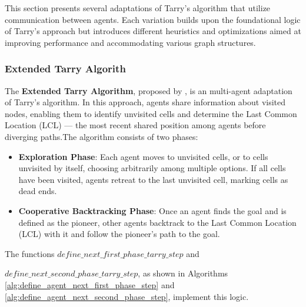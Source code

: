 This section presents several adaptations of Tarry's algorithm that utilize communication between agents. Each variation builds upon the foundational logic of Tarry's approach but introduces different heuristics and optimizations aimed at improving performance and accommodating various graph structures.

\subsubsection{Extended Tarry Algorith}
\label{section_method_extended_tarry}

The \textbf{Extended Tarry Algorithm}, proposed by , is an multi-agent adaptation of Tarry's algorithm. In this approach, agents share information about visited nodes, enabling them to identify unvisited cells and determine the Last Common Location (LCL) — the most recent shared position among agents before diverging paths.The algorithm consists of two phases:

\begin{itemize}
    \item \textbf{Exploration Phase}: Each agent moves to unvisited cells, or to cells unvisited by itself, choosing arbitrarily among multiple options. If all cells have been visited, agents retreat to the last unvisited cell, marking cells as dead ends.
    \item \textbf{Cooperative Backtracking Phase}: Once an agent finds the goal and is defined as the pioneer, other agents backtrack to the Last Common Location (LCL) with it and follow the pioneer's path to the goal.
\end{itemize}

The functions $define\_next\_first\_phase\_tarry\_step$ and 

$define\_next\_second\_phase\_tarry\_step$, as shown in Algorithms \ref{alg:define_agent_next_first_phase_step} and \ref{alg:define_agent_next_second_phase_step}, implement this logic.

